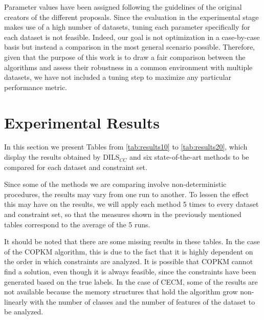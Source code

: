\documentclass[review]{elsarticle}
\begin{document}
Parameter values have been assigned following the guidelines of the original creators of the different proposals. Since the evaluation in the experimental stage makes use of a high number of datasets, tuning each parameter specifically for each dataset is not feasible. Indeed, our goal is not optimization in a case-by-case basis but instead a comparison in the most general scenario possible. Therefore, given that the purpose of this work is to draw a fair comparison between the algorithms and assess their robustness in a common environment with multiple datasets, we have not included a tuning step to maximize any particular performance metric.

\section{Experimental Results} \label{sec:results}

In this section we present Tables from \ref{tab:results10} to \ref{tab:results20}, which display the results obtained by DILS$_{CC}$ and six state-of-the-art methods to be compared for each dataset and constraint set.

Since some of the methods we are comparing involve non-deterministic procedures, the results may vary from one run to another. To lessen the effect this may have on the results, we will apply each method 5 times to every dataset and constraint set, so that the measures shown in the previously mentioned tables correspond to the average of the 5 runs.

It should be noted that there are some missing results in these tables. In the case of the COPKM algorithm, this is due to the fact that it is highly dependent on the order in which constraints are analyzed. It is possible that COPKM cannot find a solution, even though it is always feasible, since the constraints have been generated based on the true labels. In the case of CECM, some of the results are not available because the memory structures that hold the algorithm grow non-linearly with the number of classes and the number of features of the dataset to be analyzed.
	
\end{document}
